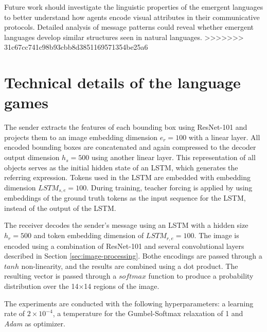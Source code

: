 \documentclass[11pt]{article}
\begin{document}
Future work should investigate the linguistic properties of the emergent languages to better understand how agents encode visual attributes in their communicative protocols.
Detailed analysis of message patterns could reveal whether emergent languages develop similar structures seen in natural languages.
>>>>>>> 31c67cc741c98b93cbb8d3851169571354be25a6



\appendix

\section{Technical details of the language games}
\label{app:technical-details-language-games}
The sender extracts the features of each bounding box using ResNet-101 and projects them to an image embedding dimension $e_r=100$ with a linear layer.
All encoded bounding boxes are concatenated and again compressed to the decoder output dimension $h_s=500$ using another linear layer.
This representation of all objects serves as the initial hidden state of an LSTM, which generates the referring expression.
Tokens used in the LSTM are embedded with embedding dimension $LSTM_{s,e}=100$.
During training, teacher forcing is applied by using embeddings of the ground truth tokens as the input sequence for the LSTM, instead of the output of the LSTM.

The receiver decodes the sender's message using an LSTM with a hidden size $h_r=500$ and token embedding dimension of $LSTM_{r,e}=100$.
The image is encoded using a combination of ResNet-101 and several convolutional layers described in Section \ref{sec:image-processing}.
Bothe encodings are passed through a $tanh$ non-linearity, and the results are combined using a dot product.
The resulting vector is passed through a $softmax$ function to produce a probability distribution over the 14$\times$14 regions of the image.

The experiments are conducted with the following hyperparameters: a learning rate of $2\times10^{-4}$, a temperature for the Gumbel-Softmax relaxation of 1 and \emph{Adam} \citep{Kingma2015} as optimizer.
\end{document}
